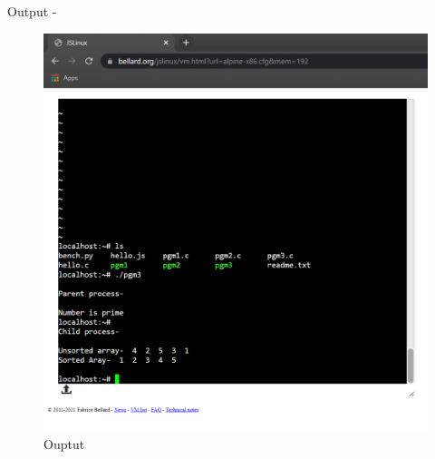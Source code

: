 \documentclass[12pt]{article}
\begin{document}
\newpage
Output -
\begin{figure}[h] %
\centering
\includegraphics[width=\textwidth]{pgmoutput.png}
\caption{Ouptut}
\end{figure}
\end{document}
